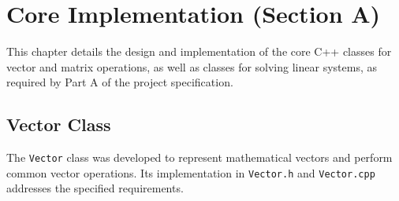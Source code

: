\chapter{Core Implementation (Section A)}
\label{chap:core_classes}

This chapter details the design and implementation of the core C++ classes for vector and matrix operations, as well as classes for solving linear systems, as required by Part A of the project specification.

\section{Vector Class}
\label{sec:vector_class}

The \texttt{Vector} class was developed to represent mathematical vectors and perform common vector operations. Its implementation in \texttt{Vector.h} and \texttt{Vector.cpp} addresses the specified requirements.

\begin{figure}

\end{figure}

